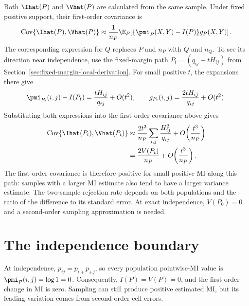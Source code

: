 Both \(\Ihat(P)\) and \(\Vhat(P)\) are calculated from the same sample. Under
fixed positive support, their first-order covariance is
\begin{equation}
  \operatorname{Cov}\{\Ihat(P),\Vhat(P)\}
  \approx \frac{1}{n_P}\E_P\!
  \left[\{\pmi_P(X,Y)-I(P)\}g_P(X,Y)\right].
\end{equation}
The corresponding expression for \(Q\) replaces \(P\) and \(n_P\) with
\(Q\) and \(n_Q\). To see its direction near independence, use the fixed-margin
path \(P_t=(q_{ij}+tH_{ij})\) from
Section~\ref{sec:fixed-margin-local-derivation}. For small positive \(t\),
the expansions there give
\begin{equation}
  \pmi_{P_t}(i,j)-I(P_t)
  =\frac{tH_{ij}}{q_{ij}}+O(t^2),
  \qquad
  g_{P_t}(i,j)=\frac{2tH_{ij}}{q_{ij}}+O(t^2).
\end{equation}
Substituting both expressions into the first-order covariance above gives
\begin{align}
  \operatorname{Cov}\{\Ihat(P_t),\Vhat(P_t)\}
  &\approx \frac{2t^2}{n_P}
      \sum_{i,j}\frac{H_{ij}^2}{q_{ij}}
      +O\!\left(\frac{t^3}{n_P}\right)\\
  &=\frac{2V(P_t)}{n_P}
      +O\!\left(\frac{t^3}{n_P}\right).
\end{align}
The first-order covariance is therefore positive for small positive MI
along this path: samples with a larger MI estimate also tend to have a
larger variance estimate. The two-sample rejection rate depends on both
populations and the ratio of the difference to its standard error.
At exact independence, \(V(P_0)=0\) and a second-order sampling
approximation is needed.

\section{The independence boundary}
\label{sec:independence-boundary}

At independence, \(p_{ij}=p_{i+}p_{+j}\), so every population
pointwise-MI value is \(\pmi_P(i,j)=\log 1=0\). Consequently,
\(I(P)=V(P)=0\), and the first-order change in MI is zero. Sampling can
still produce positive estimated MI, but its leading variation comes from
second-order cell errors.

